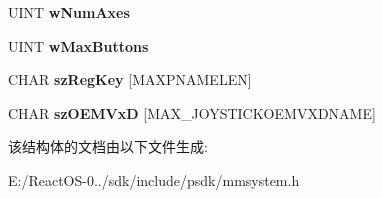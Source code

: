 \begin{DoxyCompactItemize}
U\+I\+NT {\bfseries w\+Num\+Axes}
\item 
\mbox{\label{structtag_j_o_y_c_a_p_s_a_abf2ff1f45e6073a10fbc4ed7271c295d}} 
U\+I\+NT {\bfseries w\+Max\+Buttons}
\item 
\mbox{\label{structtag_j_o_y_c_a_p_s_a_a25bd622df0b009ef60d948208f57096a}} 
C\+H\+AR {\bfseries sz\+Reg\+Key} \mbox{[}M\+A\+X\+P\+N\+A\+M\+E\+L\+EN\mbox{]}
\item 
\mbox{\label{structtag_j_o_y_c_a_p_s_a_a2971d2aeb271d3e31ed7f48bf9362d06}} 
C\+H\+AR {\bfseries sz\+O\+E\+M\+VxD} \mbox{[}M\+A\+X\+\_\+\+J\+O\+Y\+S\+T\+I\+C\+K\+O\+E\+M\+V\+X\+D\+N\+A\+ME\mbox{]}
\end{DoxyCompactItemize}


该结构体的文档由以下文件生成\+:\begin{DoxyCompactItemize}
\item 
E\+:/\+React\+O\+S-\/0../sdk/include/psdk/mmsystem.\+h\end{DoxyCompactItemize}
